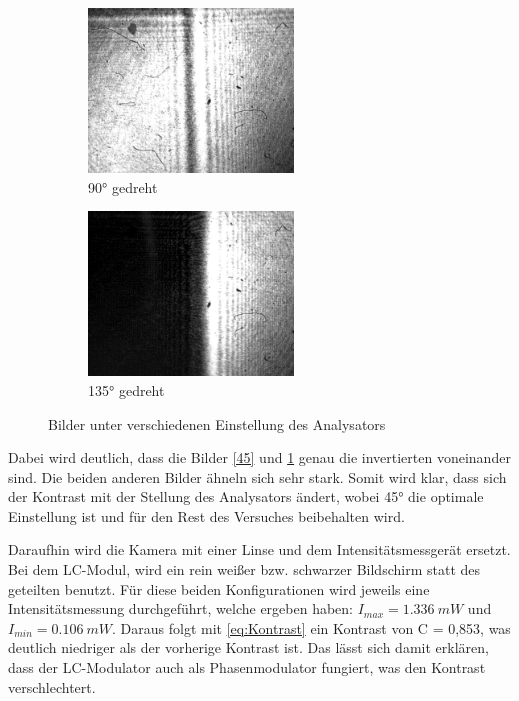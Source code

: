 \begin{figure}
	\begin{subfigure}[]{0.5\textwidth}
		\includegraphics[width=0.6\textwidth]{4.1.2_90Grad.png}
		\caption{90° gedreht}
	\end{subfigure}
	\begin{subfigure}[]{0.5\textwidth}
		\includegraphics[width=0.6\textwidth]{4.1.2_135Grad.png}
		\caption{135° gedreht}
		\label{135}
	\end{subfigure}
	\caption{Bilder unter verschiedenen Einstellung des Analysators}
	\label{Kontrast}
\end{figure}

Dabei wird deutlich, dass die Bilder \cref{45} und \cref{135} genau die invertierten voneinander sind. Die beiden anderen Bilder ähneln sich sehr stark. Somit wird klar, dass sich der Kontrast mit der Stellung des Analysators ändert, wobei 45° die optimale Einstellung ist und für den Rest des Versuches beibehalten wird. 

Daraufhin wird die Kamera mit einer Linse und dem Intensitätsmessgerät ersetzt. Bei dem LC-Modul, wird ein rein weißer bzw. schwarzer Bildschirm statt des geteilten benutzt. Für diese beiden Konfigurationen wird jeweils eine Intensitätsmessung durchgeführt, welche ergeben haben: $I_{max} = \SI{1,336}{mW}$ und $I_{min} = \SI{0,106}{mW}$. Daraus folgt mit \cref{eq:Kontrast} ein Kontrast von C = 0,853, was deutlich niedriger als der vorherige Kontrast ist. 
Das lässt sich damit erklären, dass der LC-Modulator auch als Phasenmodulator fungiert, was den Kontrast verschlechtert.

